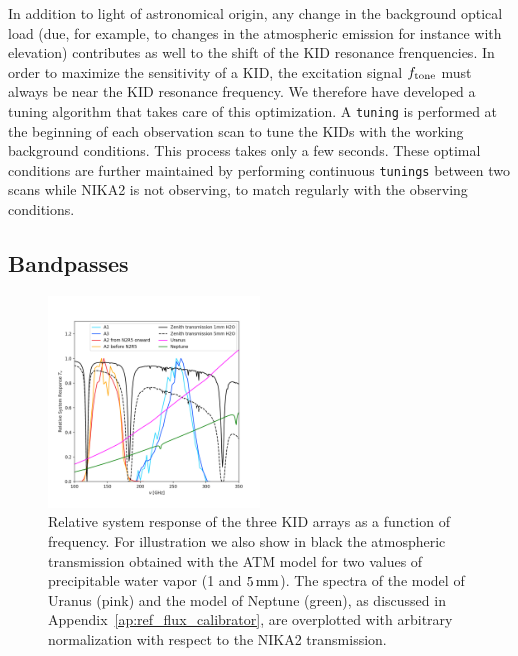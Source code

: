 In addition to light of astronomical origin, any change in the
background optical load (due, for example, to changes in
the atmospheric emission for instance with elevation) contributes as well to
the shift of the KID resonance frenquencies. In
order to maximize the sensitivity of a KID, the excitation signal $f_{\rm{tone}}$
must always be near the KID resonance frequency. We therefore have
developed a tuning algorithm that takes care of
this optimization. A {\tt tuning} is performed at the beginning
of each observation scan to tune the KIDs with the working background
conditions.
This process takes only a few seconds.
These optimal conditions are further maintained by performing
continuous {\tt tunings} between two scans while NIKA2 is not observing, to
match regularly with the observing conditions.

\subsection{Bandpasses}
\label{se:instru_bandpass}

\begin{figure}[ht!] %
\begin{center}
\includegraphics[clip,trim={0, 1cm, 0, 2cm},width=0.5\textwidth]{Figures/bandpasses_nika2_colorsok.png}
\caption[NIKA2 transmission]{Relative system response of the three KID
  arrays as a
  function of frequency. For illustration we also show in black
  the atmospheric transmission obtained with the ATM model \citep{ATM,
    Pardo2001} for two values of precipitable water vapor (1 and
  $5\,\rm{mm}$).
  The spectra of the model of Uranus (pink) and the model of
  Neptune
  (green), as discussed in Appendix~\ref{ap:ref_flux_calibrator}, are overplotted with arbitrary
  normalization with respect to the NIKA2 transmission.} 
 \label{spectralband1}
\end{center}
\end{figure}

